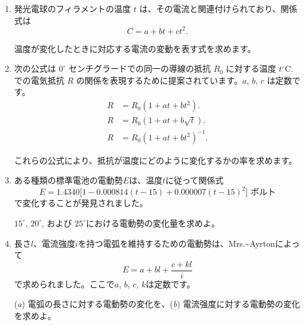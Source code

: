 \documentclass[a4paper,11pt,openany]{ltjsbook}
\begin{document}
\begin{enumerate}
\item[(11)] 発光電球のフィラメントの温度 $t$ は、その電流と関連付けられており、関係式は
\[
C = a + bt + ct^2.
\]

温度が変化したときに対応する電流の変動を表す式を求めます。

\item[(12)] 次の公式は $0^\circ$ センチグラードでの同一の導線の抵抗 $R_0$ に対する温度 $t^\circ$\;C. での電気抵抗 $R$ の関係を表現するために提案されています。$a$, $b$, $c$ は定数です。
\begin{align*}
R &= R_0(1 + at + bt^2). \\
R &= R_0(1 + at + b\sqrt{t}). \\
R &= R_0(1 + at + bt^2)^{-1}.
\end{align*}

これらの公式により、抵抗が温度にどのように変化するかの率を求めます。

\item[(13)] ある種類の標準電池の電動勢$E$は、温度$t$に従って関係式
\[
E = 1.4340 \bigl[1 - 0.000814(t-15)
                 + 0.000007(t-15)^2\bigr] \text{ ボルト}
\]
で変化することが発見されました。

$15^\circ$, $20^\circ$, および $25^\circ$における電動勢の変化量を求めよ。

\item[(14)] 長さ$l$、電流強度$i$を持つ電弧を維持するための電動勢は、Mrs.\textasciitilde{}Ayrtonによって
\[
E = a + bl + \frac{c + kl}{i}
\]
で求められました。ここで$a$, $b$, $c$, $k$は定数です。

(\textit{a}) 電弧の長さに対する電動勢の変化を、(\textit{b}) 電流强度に対する電動勢の変化を求めよ。

\end{enumerate}
\end{document}
